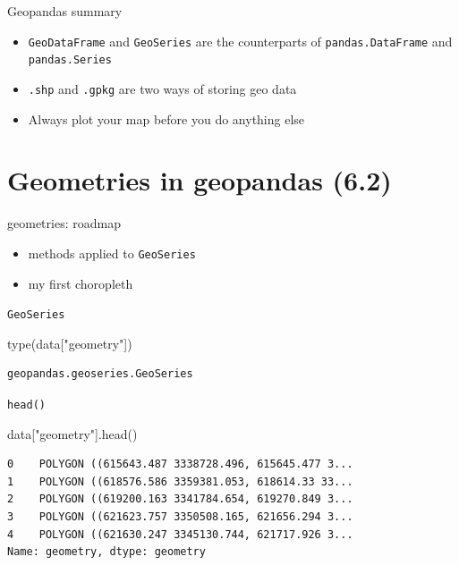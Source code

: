 \documentclass[
  ignorenonframetext,
]{beamer}
\newenvironment{Shaded}{\begin{snugshade}}{\end{snugshade}}
\newcommand{\BuiltInTok}[1]{\textcolor[rgb]{0.00,0.23,0.31}{#1}}
\newcommand{\NormalTok}[1]{\textcolor[rgb]{0.00,0.23,0.31}{#1}}
\newcommand{\StringTok}[1]{\textcolor[rgb]{0.13,0.47,0.30}{#1}}
\providecommand{\tightlist}{%
  \setlength{\itemsep}{0pt}\setlength{\parskip}{0pt}}\usepackage{longtable,booktabs,array}
\begin{document}
\begin{frame}[fragile]{Geopandas summary}
\label{geopandas-summary}
\begin{itemize}
\tightlist
\item
  \texttt{GeoDataFrame} and \texttt{GeoSeries} are the counterparts of
  \texttt{pandas.DataFrame} and \texttt{pandas.Series}
\item
  \texttt{.shp} and \texttt{.gpkg} are two ways of storing geo data
\item
  Always plot your map before you do anything else
\end{itemize}
\end{frame}

\section{Geometries in geopandas
(6.2)}\label{geometries-in-geopandas-6.2}

\begin{frame}[fragile]{geometries: roadmap}
\label{geometries-roadmap}
\begin{itemize}
\tightlist
\item
  methods applied to \texttt{GeoSeries}
\item
  my first choropleth
\end{itemize}
\end{frame}

\begin{frame}[fragile]{\texttt{GeoSeries}}
\label{geoseries}
\begin{Shaded}
\begin{Highlighting}[]
\BuiltInTok{type}\NormalTok{(data[}\StringTok{"geometry"}\NormalTok{])}
\end{Highlighting}
\end{Shaded}

\begin{verbatim}
geopandas.geoseries.GeoSeries
\end{verbatim}
\end{frame}

\begin{frame}[fragile]{\texttt{head()}}
\label{head}
\scriptsize

\begin{Shaded}
\begin{Highlighting}[]
\NormalTok{data[}\StringTok{"geometry"}\NormalTok{].head()}
\end{Highlighting}
\end{Shaded}

\begin{verbatim}
0    POLYGON ((615643.487 3338728.496, 615645.477 3...
1    POLYGON ((618576.586 3359381.053, 618614.33 33...
2    POLYGON ((619200.163 3341784.654, 619270.849 3...
3    POLYGON ((621623.757 3350508.165, 621656.294 3...
4    POLYGON ((621630.247 3345130.744, 621717.926 3...
Name: geometry, dtype: geometry
\end{verbatim}

\normalsize
\end{frame}
\end{document}
